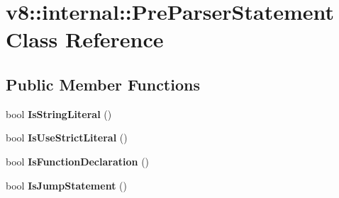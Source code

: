 \hypertarget{classv8_1_1internal_1_1_pre_parser_statement}{}\section{v8\+:\+:internal\+:\+:Pre\+Parser\+Statement Class Reference}
\label{classv8_1_1internal_1_1_pre_parser_statement}
\subsection*{Public Member Functions}
\begin{DoxyCompactItemize}
\item 
bool {\bfseries Is\+String\+Literal} ()\hypertarget{classv8_1_1internal_1_1_pre_parser_statement_aab47f7768a864f9c66b066961e2b717c}{}\label{classv8_1_1internal_1_1_pre_parser_statement_aab47f7768a864f9c66b066961e2b717c}

\item 
bool {\bfseries Is\+Use\+Strict\+Literal} ()\hypertarget{classv8_1_1internal_1_1_pre_parser_statement_a52e9507f12f73977e84da55931555f6b}{}\label{classv8_1_1internal_1_1_pre_parser_statement_a52e9507f12f73977e84da55931555f6b}

\item 
bool {\bfseries Is\+Function\+Declaration} ()\hypertarget{classv8_1_1internal_1_1_pre_parser_statement_afd51921090db14ae6ac42855554d6917}{}\label{classv8_1_1internal_1_1_pre_parser_statement_afd51921090db14ae6ac42855554d6917}

\item 
bool {\bfseries Is\+Jump\+Statement} ()\hypertarget{classv8_1_1internal_1_1_pre_parser_statement_ab1e7081bc53eb7aca8b1b2b16a75ed02}{}\label{classv8_1_1internal_1_1_pre_parser_statement_ab1e7081bc53eb7aca8b1b2b16a75ed02}

\end{DoxyCompactItemize}

